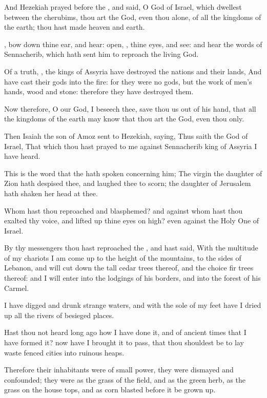 \Verse And Hezekiah prayed before the \LORD, and said, O \LORD God of Israel, which dwellest between the cherubims, thou art the God, even thou alone, of all the kingdoms of the earth; thou hast made heaven and earth.

\Verse \LORD, bow down thine ear, and hear: open, \LORD, thine eyes, and see: and hear the words of Sennacherib, which hath sent him to reproach the living God.

\Verse Of a truth, \LORD, the kings of Assyria have destroyed the nations and their lands, \Verse And have cast their gods into the fire: for they were no gods, but the work of men's hands, wood and stone: therefore they have destroyed them.

\Verse Now therefore, O \LORD our God, I beseech thee, save thou us out of his hand, that all the kingdoms of the earth may know that thou art the \LORD God, even thou only.

\Verse Then Isaiah the son of Amoz sent to Hezekiah, saying, Thus saith the \LORD God of Israel, That which thou hast prayed to me against Sennacherib king of Assyria I have heard.

\Verse This is the word that the \LORD hath spoken concerning him; The virgin the daughter of Zion hath despised thee, and laughed thee to scorn; the daughter of Jerusalem hath shaken her head at thee.

\Verse Whom hast thou reproached and blasphemed? and against whom hast thou exalted thy voice, and lifted up thine eyes on high? even against the Holy One of Israel.

\Verse By thy messengers thou hast reproached the \LORD, and hast said, With the multitude of my chariots I am come up to the height of the mountains, to the sides of Lebanon, and will cut down the tall cedar trees thereof, and the choice fir trees thereof: and I will enter into the lodgings of his borders, and into the forest of his Carmel.

\Verse I have digged and drunk strange waters, and with the sole of my feet have I dried up all the rivers of besieged places.

\Verse Hast thou not heard long ago how I have done it, and of ancient times that I have formed it? now have I brought it to pass, that thou shouldest be to lay waste fenced cities into ruinous heaps.

\Verse Therefore their inhabitants were of small power, they were dismayed and confounded; they were as the grass of the field, and as the green herb, as the grass on the house tops, and as corn blasted before it be grown up.


